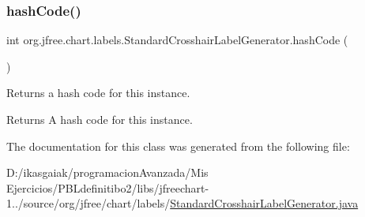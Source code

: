 \subsubsection{\texorpdfstring{hash\+Code()}{hashCode()}}
{\footnotesize\ttfamily int org.\+jfree.\+chart.\+labels.\+Standard\+Crosshair\+Label\+Generator.\+hash\+Code (\begin{DoxyParamCaption}{ }\end{DoxyParamCaption})}

Returns a hash code for this instance.

\begin{DoxyReturn}{Returns}
A hash code for this instance. 
\end{DoxyReturn}


The documentation for this class was generated from the following file\+:\begin{DoxyCompactItemize}
\item 
D\+:/ikasgaiak/programacion\+Avanzada/\+Mis Ejercicios/\+P\+B\+Ldefinitibo2/libs/jfreechart-\/1../source/org/jfree/chart/labels/\mbox{\hyperlink{_standard_crosshair_label_generator_8java}{Standard\+Crosshair\+Label\+Generator.\+java}}\end{DoxyCompactItemize}
